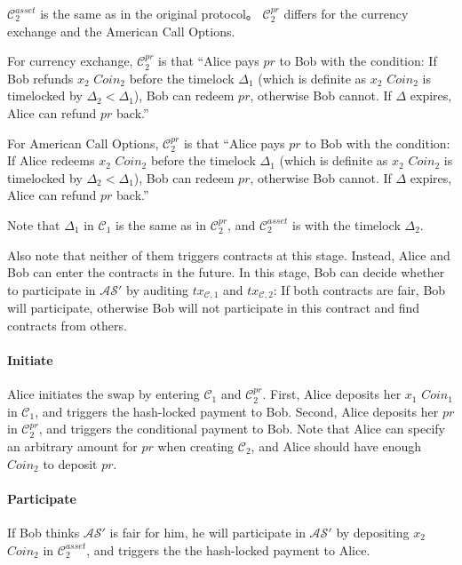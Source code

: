$\mathcal{C}^{asset}_2$ is the same as in the original protocol。
$\mathcal{C}^{pr}_2$ differs for the currency exchange and the American Call Options.

For currency exchange, $\mathcal{C}^{pr}_2$ is that
``Alice pays $pr$ to Bob with the condition: If Bob refunds $x_2$ $Coin_2$ before the timelock $\Delta_1$ (which is definite as $x_2$ $Coin_2$ is timelocked by $\Delta_2 < \Delta_1$), Bob can redeem $pr$, otherwise Bob cannot.
If $\Delta$ expires, Alice can refund $pr$ back.''

For American Call Options, $\mathcal{C}^{pr}_2$ is that
``Alice pays $pr$ to Bob with the condition: If Alice redeems $x_2$ $Coin_2$ before the timelock $\Delta_1$ (which is definite as $x_2$ $Coin_2$ is timelocked by $\Delta_2 < \Delta_1$), Bob can redeem $pr$, otherwise Bob cannot.
If $\Delta$ expires, Alice can refund $pr$ back.''


Note that $\Delta_1$ in $\mathcal{C}_1$ is the same as in $\mathcal{C}^{pr}_2$, and $\mathcal{C}^{asset}_2$ is with the timelock $\Delta_2$.

Also note that neither of them triggers contracts at this stage.
Instead, Alice and Bob can enter the contracts in the future.
In this stage, Bob can decide whether to participate in $\mathcal{AS}'$ by auditing $tx_{\mathcal{C}, 1}$ and $tx_{\mathcal{C}, 2}$: If both contracts are fair, Bob will participate, otherwise Bob will not participate in this contract and find contracts from others.

\paragraph{Initiate}
Alice initiates the swap by entering $\mathcal{C}_1$ and $\mathcal{C}^{pr}_2$.
First, Alice deposits her $x_1$ $Coin_1$ in $\mathcal{C}_1$, and triggers the hash-locked payment to Bob.
Second, Alice deposits her $pr$ in $\mathcal{C}^{pr}_2$, and triggers the conditional payment to Bob.
Note that Alice can specify an arbitrary amount for $pr$ when creating $\mathcal{C}_2$, and Alice should have enough $Coin_2$ to deposit $pr$.

\paragraph{Participate}
If Bob thinks $\mathcal{AS}'$ is fair for him, he will participate in $\mathcal{AS}'$ by depositing $x_2$ $Coin_2$ in $\mathcal{C}^{asset}_2$, and triggers the the hash-locked payment to Alice.


